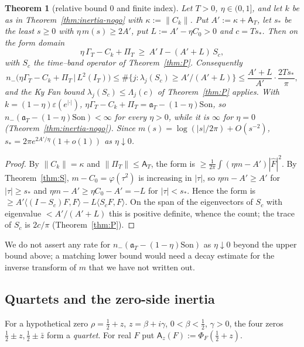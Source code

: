 \documentclass[11pt]{amsart}
\newtheorem{theorem}{Theorem}[section]
\theoremstyle{definition}
\theoremstyle{remark}
\newcommand{\IT}{I_T}
\newcommand{\Fh}{\widehat F}
\newcommand{\Aconst}{\mathsf A_T}
\newcommand{\PiT}{\Pi_T}
\begin{document}
\begin{theorem}[relative bound $0$ and finite index]\label{thm:inertia-finite}
Let $T>0$, $\eta\in(0,1]$, and let $k$ be as in Theorem~\ref{thm:inertia-nogo} with $\kappa:=\|C_k\|$. Put
$A':=\kappa+\Aconst$, let $s_*$ be the least $s\ge0$ with $\eta\,m(s)\ge2A'$, put $L:=A'-\eta C_0>0$ and
$c=Ts_*$. Then on the form domain
\[
\eta\,\Gamma_T-C_k+\PiT\ \ge\ A'\,I-(A'+L)\,S_c ,
\]
with $S_c$ the time--band operator of Theorem~\ref{thm:P}. Consequently
\[
n_-\big(\eta\Gamma_T-C_k+\PiT\,\big|\,L^2(\IT)\big)\le\#\{j:\lambda_j(S_c)\ge A'/(A'+L)\}
\le\frac{A'+L}{A'}\cdot\frac{2Ts_*}{\pi},
\]
and the Ky Fan bound $\lambda_j(S_c)\le\Lambda_j(c)$ of Theorem~\ref{thm:P} applies. With
$k=(1-\eta)\varepsilon(e^{|\cdot|})$, $\eta\Gamma_T-C_k+\PiT=\mathfrak a_T-(1-\eta)\mathrm{Son}$, so
$n_-(\mathfrak a_T-(1-\eta)\mathrm{Son})<\infty$ for every $\eta>0$, while it is $\infty$ for $\eta=0$
(Theorem~\ref{thm:inertia-nogo}). Since $m(s)=\log(|s|/2\pi)+O(s^{-2})$, $s_*=2\pi e^{2A'/\eta}(1+o(1))$ as $\eta\downarrow0$.
\end{theorem}
\begin{proof}
By $\|C_k\|=\kappa$ and
$\|\PiT\|\le\Aconst$, the form is $\ge\frac1{2\pi}\int(\eta m-A')|\Fh|^2$. By Theorem~\ref{thm:S}, $m-C_0=\varphi(\tau^2)$
is increasing in $|\tau|$, so $\eta m-A'\ge A'$ for $|\tau|\ge s_*$ and $\eta m-A'\ge\eta C_0-A'=-L$ for
$|\tau|<s_*$. Hence the form is $\ge A'\langle(I-S_c)F,F\rangle-L\langle S_cF,F\rangle$. On the span of the
eigenvectors of $S_c$ with eigenvalue $<A'/(A'+L)$ this is positive definite, whence the count; the trace of $S_c$
is $2c/\pi$ (Theorem~\ref{thm:P}).
\end{proof}
We do not assert any rate for $n_-(\mathfrak a_T-(1-\eta)\mathrm{Son})$ as $\eta\downarrow0$ beyond the
upper bound above; a matching lower bound would need a decay estimate for the inverse transform of $m$ that we
have not written out.

\subsection{Quartets and the zero-side inertia}
For a hypothetical zero $\rho=\frac12+z$, $z=\beta+i\gamma$, $0<\beta<\frac12$, $\gamma>0$, the four zeros
$\frac12\pm z,\frac12\pm\bar z$ form a \emph{quartet}. For real $F$ put $\mathsf A_z(F):=\Phi_F(\frac12+z)$.
\end{document}
